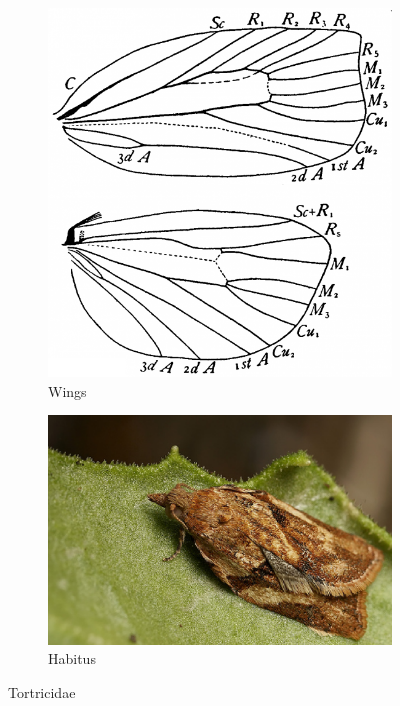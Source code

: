 \documentclass[letterpaper, 11pt]{article}
\begin{document}
\begin{figure}[ht!]
    \centering
    \begin{subfigure}[ht!]{0.35\textwidth}
        \includegraphics[width=\textwidth]{TortricidWings}
        \caption{Wings \citep[Fig. 353]{comstock1918wings}}
        \label{fig:tortricid1}
    \end{subfigure}
    \qquad %
    \begin{subfigure}[ht!]{0.48\textwidth}
        \includegraphics[width=\textwidth]{image45}
        \caption{Habitus}
        \label{fig:tortricid2}
    \end{subfigure}
    \caption{Tortricidae}\label{fig:tortricids}
\end{figure}
\end{document}
